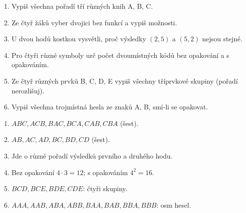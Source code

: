 \documentclass[11pt,a4paper]{article}
\begin{document}
\begin{zadaniReseniBox}[title={Domácí úkol}]

\begin{enumerate}[label=\alph*),leftmargin=*,itemsep=2pt]

\item Vypiš všechna pořadí tří různých knih A, B, C.
\item Ze čtyř žáků vyber dvojici bez funkcí a vypiš možnosti.
\item U dvou hodů kostkou vysvětli, proč výsledky $(2,5)$ a $(5,2)$ nejsou stejné.
\item Pro čtyři různé symboly urč počet dvoumístných kódů bez opakování a s opakováním.
\item Ze čtyř různých prvků B, C, D, E vypiš všechny tříprvkové skupiny (pořadí nerozlišuj).
\item Vypiš všechna trojmístná hesla ze znaků A, B, smí-li se opakovat.

\end{enumerate}

\tcblower

\begin{enumerate}[label=\alph*),leftmargin=*,itemsep=2pt]

\item $ABC,ACB,BAC,BCA,CAB,CBA$ (šest).
\item $AB,AC,AD,BC,BD,CD$ (šest).
\item Jde o různé pořadí výsledků prvního a druhého hodu.
\item Bez opakování $4\cdot3=12$; s opakováním $4^2=16$.
\item $BCD,BCE,BDE,CDE$: čtyři skupiny.
\item $AAA,AAB,ABA,ABB,BAA,BAB,BBA,BBB$: osm hesel.

\end{enumerate}

\end{zadaniReseniBox}

\end{document}
